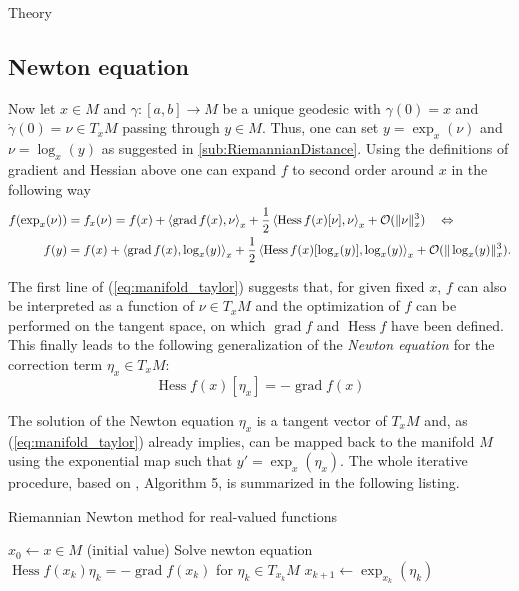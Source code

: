 \begin{chapter}{Theory}
\subsection{Newton equation} %
\label{sub:Newton equation}
Now let $x\in M$ and $\gamma:[a,b] \to M$ be a unique geodesic with $\gamma(0)=x$ and $\dot{\gamma}(0)=\nu\in T_xM$ 
passing through $y\in M$. Thus, one can set $y=\exp_x(\nu)$ and $\nu=\log_x(y)$ as suggested in \ref{sub:RiemannianDistance}. Using the
definitions of gradient and Hessian above one can expand $f$ to second order around $x$ in the following way
\begin{align}
    \label{eq:manifold_taylor}
    f(\exp_x(\nu)) &= f_x(\nu) = f(x) + \left\langle \operatorname{grad}f(x),\nu \right\rangle_x + \frac{1}{2}\left\langle \operatorname{Hess}f(x)[\nu],\nu \right\rangle_x + \mathcal{O}(\| \nu \|_x^3)\quad \Leftrightarrow \\
    f(y) &= f(x) + \left\langle \operatorname{grad}f(x),\log_x(y) \right\rangle_x + \frac{1}{2}\left\langle \operatorname{Hess}f(x)[\log_x(y)],\log_x(y) \right\rangle_x + \mathcal{O}(\| \log_x(y) \|_x^3).\nonumber
\end{align}

The first line of (\ref{eq:manifold_taylor}) suggests that, for given fixed $x$, $f$ can also be interpreted as a function of $\nu\in T_xM$ and the optimization of $f$ can be 
performed on the tangent space, on which $\operatorname{grad}f$ and $\operatorname{Hess}f$ have been defined. 
This finally leads to the following generalization of the \emph{Newton equation}
for the correction term $\eta_x \in T_xM$:
\begin{equation}
    \label{eq:newtoneq}
    \operatorname{Hess}f(x)[\eta_x]=-\operatorname{grad}f(x)
\end{equation}

The solution of the Newton equation $\eta_x$ is a tangent vector of $T_xM$ and, as (\ref{eq:manifold_taylor}) already implies, can be mapped back to the manifold $M$ 
using the exponential map such that $y'=\exp_x(\eta_x)$. The whole iterative procedure, based on \cite{Absil2009}, Algorithm 5, is summarized in the following listing.
\begin{algorithm}
\caption{Riemannian Newton method for real-valued functions}
\label{al:real_riemannian_newton}
\begin{algorithmic}
\STATE $x_0 \leftarrow x\in M$ (initial value)
\STATE Solve newton equation $\operatorname{Hess} f(x_k)\eta_k = -\operatorname{grad} f(x_k)$ for $\eta_k\in T_{x_k}M$
\STATE $x_{k+1} \leftarrow \exp_{x_k}(\eta_k)$
\ENDFOR
\end{algorithmic}
\end{algorithm}


\end{chapter}
